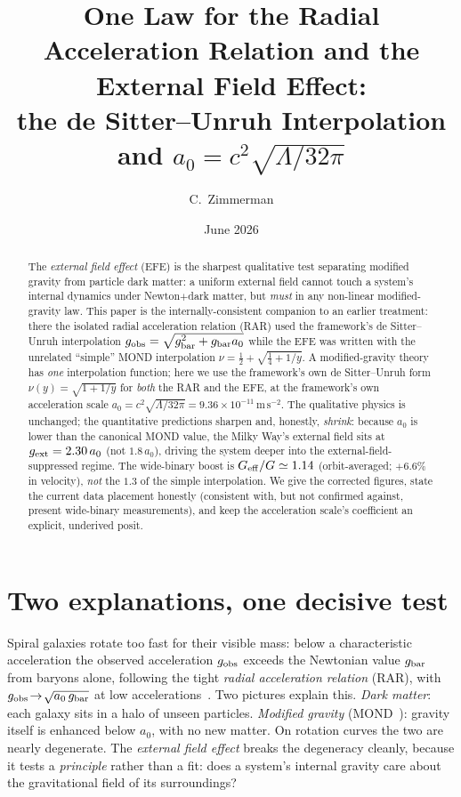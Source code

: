 \documentclass[aps,prd,twocolumn,10pt,nofootinbib]{revtex4-2}
\begin{document}
\title{One Law for the Radial Acceleration Relation and the External Field Effect:\\
the de Sitter--Unruh Interpolation and $a_0=c^2\sqrt{\Lambda/32\pi}$}
\author{C.\ Zimmerman}
\date{June 2026}

\begin{abstract}
The \emph{external field effect} (EFE) is the sharpest qualitative test separating modified gravity from particle
dark matter: a uniform external field cannot touch a system's internal dynamics under Newton$+$dark matter, but
\emph{must} in any non-linear modified-gravity law. This paper is the internally-consistent companion to an
earlier treatment: there the isolated radial acceleration relation (RAR) used the framework's de Sitter--Unruh
interpolation $g_{\rm obs}=\sqrt{g_{\rm bar}^2+g_{\rm bar}a_0}$ while the EFE was written with the unrelated
``simple'' MOND interpolation $\nu=\tfrac12+\sqrt{\tfrac14+1/y}$. A modified-gravity theory has \emph{one}
interpolation function; here we use the framework's own de Sitter--Unruh form $\nu(y)=\sqrt{1+1/y}$ for
\emph{both} the RAR and the EFE, at the framework's own acceleration scale $a_0=c^2\sqrt{\Lambda/32\pi}=
9.36\times10^{-11}\,\mathrm{m\,s^{-2}}$. The qualitative physics is unchanged; the quantitative predictions
sharpen and, honestly, \emph{shrink}: because $a_0$ is lower than the canonical MOND value, the Milky Way's
external field sits at $g_{\rm ext}=2.30\,a_0$ (not $1.8\,a_0$), driving the system deeper into the
external-field-suppressed regime. The wide-binary boost is $G_{\rm eff}/G\simeq1.14$ (orbit-averaged;
$+6.6\%$ in velocity), \emph{not} the $1.3$ of the simple interpolation. We give the corrected figures, state the
current data placement honestly (consistent with, but not confirmed against, present wide-binary measurements),
and keep the acceleration scale's coefficient an explicit, underived posit.
\end{abstract}

\maketitle

\section{Two explanations, one decisive test}
Spiral galaxies rotate too fast for their visible mass: below a characteristic acceleration the observed
acceleration $g_{\rm obs}$ exceeds the Newtonian value $g_{\rm bar}$ from baryons alone, following the tight
\emph{radial acceleration relation} (RAR), with $g_{\rm obs}\!\to\!\sqrt{a_0\,g_{\rm bar}}$ at low
accelerations~\cite{McGaugh2016}. Two pictures explain this. \emph{Dark matter}: each galaxy sits in a halo of
unseen particles. \emph{Modified gravity} (MOND~\cite{Milgrom1983}): gravity itself is enhanced below $a_0$, with
no new matter. On rotation curves the two are nearly degenerate. The \emph{external field effect} breaks the
degeneracy cleanly, because it tests a \emph{principle} rather than a fit: does a system's internal gravity care
about the gravitational field of its surroundings?
\end{document}
